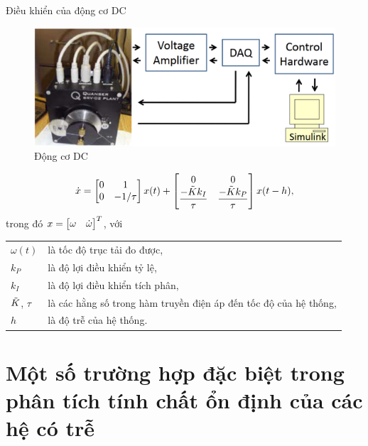 \documentclass[10pt]{beamer}
\begin{document}
    \small{
	\begin{frame}{Điều khiển của động cơ DC}
		    \begin{figure}[h!]
				\centering
				\includegraphics[scale= 0.25]{"../Hinh/DCmotor"}
				\caption[Động cơ DC]{Động cơ DC}
				\label{fig:DCmotor}
			\end{figure}
			  \begin{equation*}\label{dc}
				\dot{x} = 
				\begin{bmatrix} 0 & 1 \\ 0 & -1/\tau \end{bmatrix} x(t)
				+ 
				\begin{bmatrix} 0 & 0 \\ \dfrac{-\tilde{K} k_I}{\tau} & \dfrac{-\tilde{K} k_P}{\tau} \end{bmatrix} x(t-h),
			\end{equation*}
		trong đó $x = \begin{bmatrix} \omega & \dot{\omega} \end{bmatrix}^T$, với \\
		\begin{tabular}{ll}
				$\omega(t)$   &   là tốc độ trục tải đo được,  \\
				$k_P$          &   là độ lợi điều khiển tỷ lệ,  \\
				$k_I$       &   là độ lợi điều khiển tích phân, \\
				$\tilde{K}$, $\tau$ &   là các hằng số trong hàm truyền điện áp đến tốc độ của hệ thống, \\
				$h$         & là độ trễ của hệ thống.
			\end{tabular} 
	 \end{frame}
	}

	\section{Một số trường hợp đặc biệt trong phân tích tính chất \linebreak ổn định của các hệ có trễ}
	
\end{document}
